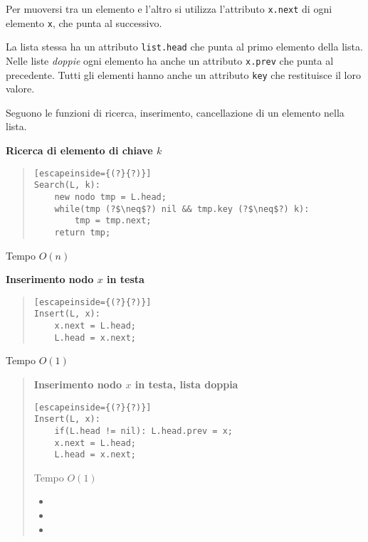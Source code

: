 \documentclass[a4paper,10pt]{article}
\theoremstyle{definition}
\begin{document}
Per muoversi tra un elemento e l'altro si utilizza l'attributo \texttt{x.next} di ogni elemento \texttt{x}, che punta al successivo.\smallskip

La lista stessa ha un attributo \texttt{list.head} che punta al primo elemento della lista. Nelle liste \emph{doppie} ogni elemento 
ha anche un attributo \texttt{x.prev} che punta al precedente.
Tutti gli elementi hanno anche un attributo \texttt{key} che restituisce il loro valore.
\smallskip

Seguono le funzioni di ricerca, inserimento, cancellazione di un elemento nella lista.
\smallskip
\begin{multicols}{2}
\textbf{Ricerca di elemento di chiave $k$}
\begin{quote}
\begin{lstlisting}[escapeinside={(?}{?)}]
Search(L, k):
    new nodo tmp = L.head;
    while(tmp (?$\neq$?) nil && tmp.key (?$\neq$?) k):
        tmp = tmp.next;
    return tmp;
\end{lstlisting}
\end{quote}
Tempo $O(n)$\smallskip


\textbf{Inserimento nodo $x$ in testa}
\begin{quote}
\begin{lstlisting}[escapeinside={(?}{?)}]
Insert(L, x):
    x.next = L.head;
    L.head = x.next;
\end{lstlisting}
\end{quote}
Tempo $O(1)$\smallskip


\begin{quote}
\textbf{Inserimento nodo $x$ in testa, lista doppia}
\begin{lstlisting}[escapeinside={(?}{?)}]
Insert(L, x):
    if(L.head != nil): L.head.prev = x;
    x.next = L.head;
    L.head = x.next;
\end{lstlisting}
Tempo $O(1)$
\begin{itemize}
 \item[]
 \item[]
 \item[]
\end{itemize}

\end{quote}




\end{multicols}\newpage
\end{document}

